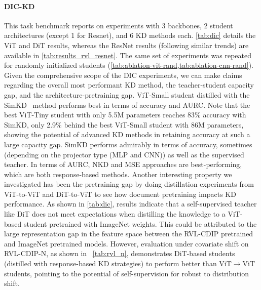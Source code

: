 \documentclass[runningheads]{llncs}
\begin{document}
\paragraph{DIC-KD} This task benchmark reports on experiments with 3 backbones, 2 student architectures (except 1 for Resnet), and 6 KD methods each. \cref{tab:dic} details the ViT and DiT results, whereas the ResNet results (following similar trends) are available in \cref{tab:results_rvl_resnet}.
The same set of experiments was repeated for randomly initialized students (\cref{tab:ablation-vit-rand,tab:ablation-cnn-rand}).
Given the comprehensive scope of the DIC experiments, we can make claims regarding the overall most performant KD method, the teacher-student capacity gap, and the architecture-pretraining gap.
ViT-Small student distilled with the SimKD~\cite{SimKD} method performs best in terms of accuracy and AURC. Note that the best ViT-Tiny student with only 5.5M parameters reaches 83\% accuracy with SimKD, only 2.9\% behind the best ViT-Small student with 86M parameters, showing the potential of advanced KD methods in retaining accuracy at such a large capacity gap.
SimKD performs admirably in terms of accuracy, sometimes (depending on the projector type (MLP and CNN)) as well as the supervised teacher. In terms of AURC, NKD and MSE approaches are best-performing, which are both response-based methods. Another interesting property we investigated has been the pretraining gap by doing distillation experiments from ViT-to-ViT and DiT-to-ViT to see how document pretraining impacts KD performance.
As shown in \cref{tab:dic}, results indicate that a self-supervised teacher like DiT does not meet expectations when distilling the knowledge to a ViT-based student pretrained with ImageNet weights. This could be attributed to the large representation gap in the feature space between the RVL-CDIP pretrained and ImageNet pretrained models. However, evaluation under covariate shift on RVL-CDIP-N, as shown in ~\cref{tab:rvl_n}, demonstrates DiT-based students (distilled with response-based KD strategies) to perform better than ViT$\to$ViT students, pointing to the potential of self-supervision for robust to distribution shift.
\end{document}
